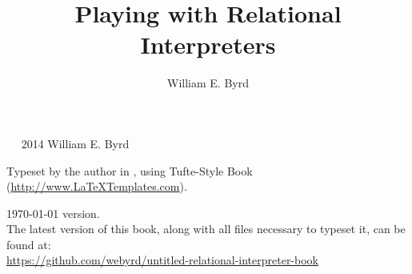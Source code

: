 \documentclass[nols]{tufte-book}
\title{Playing with Relational Interpreters}
\author{William E. Byrd}
\newcommand{\blankpage}{\newpage\hbox{}\thispagestyle{empty}\newpage} %
\begin{document}
\begin{schemeregion}

\frontmatter



\renewcommand{\maketitlepage}[0]{%
  \cleardoublepage%
  {%
  \rmfamily%
  \begin{fullwidth}%
  \fontsize{36}{38}\selectfont\par\noindent\textcolor{darkgray}{Playing with \\\noindent Relational Interpreters}%
  \vspace{3pc}%
  \sffamily%
  \fontsize{20}{22}\selectfont\par\noindent\textcolor{darkgray}{\allcaps{\thanklessauthor}}%
  \vfill%
  \fontsize{14}{16}\selectfont\par\noindent\allcaps{\thanklesspublisher}%
  \end{fullwidth}%
  }

  \thispagestyle{empty}%
  \clearpage%
}

\maketitle %

\blankpage

\blankpage

\blankpage

\blankpage

\blankpage




\newpage

\begin{fullwidth}
~\vfill
\thispagestyle{empty}
\setlength{\parindent}{0pt}
\setlength{\parskip}{\baselineskip}
\large
\noindent
\textcopyright~2014 William E. Byrd

\noindent
Typeset by the author in \XeLaTeX, using Tufte-Style Book (\url{http://www.LaTeXTemplates.com}).

\today\xspace version. \\ The latest version of this book, along with all files necessary to typeset it, can be found at: \\ \url{https://github.com/webyrd/untitled-relational-interpreter-book}


\end{fullwidth}
\end{schemeregion}
\end{document}

